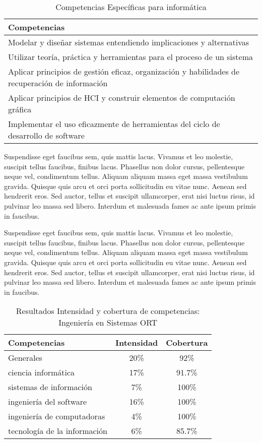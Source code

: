 \begin{table}[h]
\centering
\caption{Competencias Específicas para informática}
\begin{tabular}[t]{|p{12cm}|}
\hline
Competencias\\
\hline
Modelar y diseñar sistemas entendiendo implicaciones y alternativas\\
Utilizar teoría, práctica y herramientas para el proceso de un sistema\\
Aplicar principios de gestión eficaz, organización y habilidades de recuperación de información\\
Aplicar principios de HCI y construir elementos de computación gráfica\\
Implementar el uso eficazmente de herramientas del ciclo de desarrollo de software \\
\hline
\end{tabular}
\label{tab:compgen2}
\end{table}


Suspendisse eget faucibus sem, quis mattis lacus. Vivamus et leo molestie, suscipit tellus faucibus, finibus lacus. Phasellus non dolor cursus, pellentesque neque vel, condimentum tellus. Aliquam aliquam massa eget massa vestibulum gravida. Quisque quis arcu et orci porta sollicitudin eu vitae nunc. Aenean sed hendrerit eros. Sed auctor, tellus et suscipit ullamcorper, erat nisi luctus risus, id pulvinar leo massa sed libero. Interdum et malesuada fames ac ante ipsum primis in faucibus.

Suspendisse eget faucibus sem, quis mattis lacus. Vivamus et leo molestie, suscipit tellus faucibus, finibus lacus. Phasellus non dolor cursus, pellentesque neque vel, condimentum tellus. Aliquam aliquam massa eget massa vestibulum gravida. Quisque quis arcu et orci porta sollicitudin eu vitae nunc. Aenean sed hendrerit eros. Sed auctor, tellus et suscipit ullamcorper, erat nisi luctus risus, id pulvinar leo massa sed libero. Interdum et malesuada fames ac ante ipsum primis in faucibus.


\begin{table}[h]
\centering
\caption{Resultados Intensidad y cobertura de competencias: Ingeniería en Sistemas ORT}
\begin{tabular}[t]{lcc}
\hline
Competencias&Intensidad&Cobertura\\
\hline
Generales&20\%&92\%\\
ciencia informática&17\%&91.7\%\\
sistemas de información&7\%&100\%\\
ingeniería del software&16\%&100\%\\
ingeniería de computadoras&4\%&100\%\\
tecnología de la información&6\%&85.7\%\\
\hline
\end{tabular}
\label{tab:compgen3}
\end{table}


